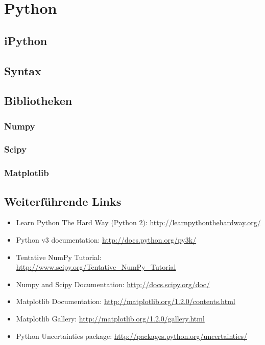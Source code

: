 \chapter{Python}
\section{iPython}
\section{Syntax}
\section{Bibliotheken}
\subsection{Numpy}
\subsection{Scipy}
\subsection{Matplotlib}

\section{Weiterführende Links}
\begin{itemize}
  \item Learn Python The Hard Way (Python 2): \url{http://learnpythonthehardway.org/}
  \item Python v3 documentation: \url{http://docs.python.org/py3k/}
  \item Tentative NumPy Tutorial: \url{http://www.scipy.org/Tentative\_NumPy\_Tutorial}
  \item Numpy and Scipy Documentation: \url{http://docs.scipy.org/doc/}
  \item Matplotlib Documentation: \url{http://matplotlib.org/1.2.0/contents.html}
  \item Matplotlib Gallery: \url{http://matplotlib.org/1.2.0/gallery.html}
  \item Python Uncertainties package: \url{http://packages.python.org/uncertainties/}
\end{itemize}
